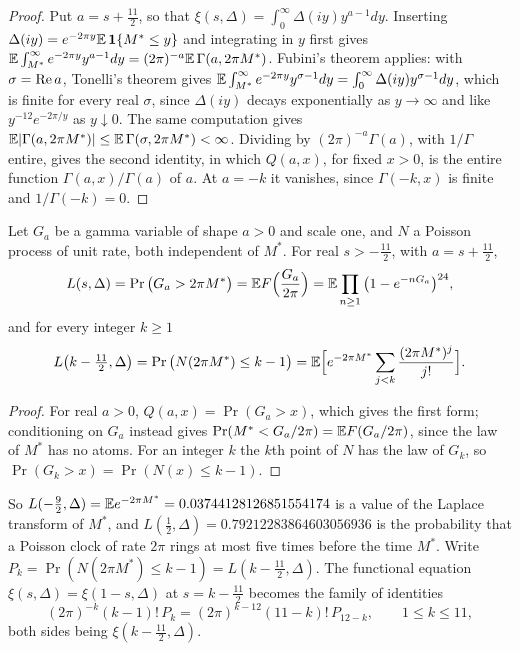 \begin{proof}
Put $a=s+\frac{11}2$, so that $\xi(s,\Delta)=\int_0^\infty\Delta(iy)y^{a-1}dy$. Inserting $\Delta(iy)=e^{-2\pi y}\mathbb{E}\,\mathbf 1\{M^*\le y\}$ and integrating in $y$ first gives $\mathbb{E}\int_{M^*}^\infty e^{-2\pi y}y^{a-1}dy=(2\pi)^{-a}\mathbb{E}\,\Gamma(a,2\pi M^*)$. Fubini's theorem applies: with $\sigma=\operatorname{Re} a$, Tonelli's theorem gives $\mathbb{E}\int_{M^*}^\infty e^{-2\pi y}y^{\sigma-1}dy=\int_0^\infty\Delta(iy)y^{\sigma-1}dy$, which is finite for every real $\sigma$, since $\Delta(iy)$ decays exponentially as $y\to\infty$ and like $y^{-12}e^{-2\pi/y}$ as $y\downarrow0$. The same computation gives $\mathbb{E}|\Gamma(a,2\pi M^*)|\le\mathbb{E}\,\Gamma(\sigma,2\pi M^*)<\infty$. Dividing by $(2\pi)^{-a}\Gamma(a)$, with $1/\Gamma$ entire, gives the second identity, in which $Q(a,x)$, for fixed $x>0$, is the entire function $\Gamma(a,x)/\Gamma(a)$ of $a$. At $a=-k$ it vanishes, since $\Gamma(-k,x)$ is finite and $1/\Gamma(-k)=0$.
\end{proof}

\begin{corollary}\label{cor:maxexp:forms}
Let $G_a$ be a gamma variable of shape $a>0$ and scale one, and $N$ a Poisson process of unit rate, both independent of $M^*$. For real $s>-\frac{11}2$, with $a=s+\frac{11}2$,
\[
L(s,\Delta)=\Pr\big(G_a>2\pi M^*\big)=\mathbb{E} F\Big(\frac{G_a}{2\pi}\Big)=\mathbb{E}\prod_{n\ge1}\big(1-e^{-nG_a}\big)^{24},
\]
and for every integer $k\ge1$
\[
L\big(k-\tfrac{11}2,\Delta\big)=\Pr\big(N(2\pi M^*)\le k-1\big)=\mathbb{E}\Big[e^{-2\pi M^*}\sum_{j<k}\frac{(2\pi M^*)^j}{j!}\Big].
\]
\end{corollary}

\begin{proof}
For real $a>0$, $Q(a,x)=\Pr(G_a>x)$, which gives the first form; conditioning on $G_a$ instead gives $\Pr(M^*<G_a/2\pi)=\mathbb{E} F(G_a/2\pi)$, since the law of $M^*$ has no atoms. For an integer $k$ the $k$th point of $N$ has the law of $G_k$, so $\Pr(G_k>x)=\Pr(N(x)\le k-1)$.
\end{proof}

So $L(-\frac92,\Delta)=\mathbb{E} e^{-2\pi M^*}=0.03744128126851554174$ is a value of the Laplace transform of $M^*$, and $L(\frac12,\Delta)=0.79212283864603056936$ is the probability that a Poisson clock of rate $2\pi$ rings at most five times before the time $M^*$. Write $P_k=\Pr(N(2\pi M^*)\le k-1)=L(k-\frac{11}2,\Delta)$. The functional equation $\xi(s,\Delta)=\xi(1-s,\Delta)$ at $s=k-\frac{11}2$ becomes the family of identities
\begin{equation}\label{eq:maxexp:fe}
(2\pi)^{-k}(k-1)!\,P_k=(2\pi)^{k-12}(11-k)!\,P_{12-k},\qquad1\le k\le11,
\end{equation}
both sides being $\xi(k-\frac{11}2,\Delta)$.

